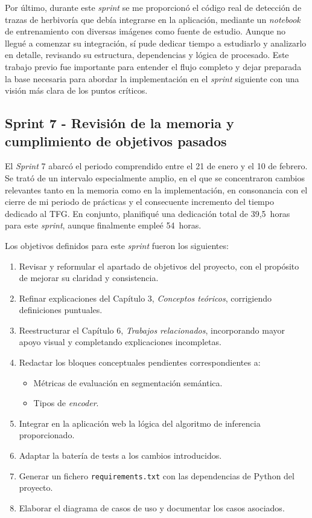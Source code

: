 Por último, durante este \textit{sprint} se me proporcionó el código real de detección de trazas de herbivoría que debía integrarse en la aplicación, mediante un \textit{notebook} de entrenamiento con diversas imágenes como fuente de estudio. Aunque no llegué a comenzar su integración, sí pude dedicar tiempo a estudiarlo y analizarlo en detalle, revisando su estructura, dependencias y lógica de procesado. Este trabajo previo fue importante para entender el flujo completo y dejar preparada la base necesaria para abordar la implementación en el \textit{sprint} siguiente con una visión más clara de los puntos críticos.

\subsection{Sprint 7 - Revisión de la memoria y cumplimiento de objetivos pasados}
El \textit{Sprint} 7 abarcó el periodo comprendido entre el 21 de enero y el 10 de febrero. Se trató de un intervalo especialmente amplio, en el que se concentraron cambios relevantes tanto en la memoria como en la implementación, en consonancia con el cierre de mi periodo de prácticas y el consecuente incremento del tiempo dedicado al TFG. En conjunto, planifiqué una dedicación total de 39,5~horas para este \textit{sprint}, aunque finalmente empleé 54~horas.

Los objetivos definidos para este \textit{sprint} fueron los siguientes:
\begin{enumerate}
	\item Revisar y reformular el apartado de objetivos del proyecto, con el propósito de mejorar su claridad y consistencia.
	\item Refinar explicaciones del Capítulo 3, \textit{Conceptos teóricos}, corrigiendo definiciones puntuales.
	\item Reestructurar el Capítulo 6, \textit{Trabajos relacionados}, incorporando mayor apoyo visual y completando explicaciones incompletas.
	\item Redactar los bloques conceptuales pendientes correspondientes a:
	\begin{itemize}
		\item Métricas de evaluación en segmentación semántica.
		\item Tipos de \textit{encoder}.
	\end{itemize}
	\item Integrar en la aplicación web la lógica del algoritmo de inferencia proporcionado.
	\item Adaptar la batería de tests a los cambios introducidos.
	\item Generar un fichero \texttt{requirements.txt} con las dependencias de Python del proyecto.
	\item Elaborar el diagrama de casos de uso y documentar los casos asociados.
\end{enumerate}

